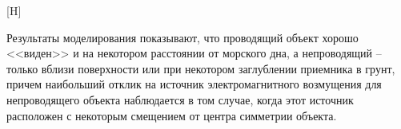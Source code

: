 \documentclass[a4paper,14pt]{article}
\makeatletter
\renewenvironment{figure}[1][\fps@figure]{
  \edef\@tempa{\noexpand\@float{figure}[#1]}
  \@tempa
  \addtocounter{foofigure}{1}
}{
  \end@float
}
\renewcommand{\Re}{\mathop{\mathrm{Re}}\nolimits}
\makeatother
\begin{document}
\begin{figure}[H]
	\centering
	\text{~~}
	\caption{$\Re(\mathbf{E}_z)$ при $l_2=-300$}
	\label{fig:res3:300_EzR}
\end{figure}


Результаты моделирования показывают, что проводящий объект хорошо <<виден>> и на некотором расстоянии от морского дна, а непроводящий -- только вблизи поверхности или при некотором заглублении приемника в грунт, причем наибольший отклик на источник электромагнитного возмущения для непроводящего объекта наблюдается в том случае, когда этот источник расположен с некоторым смещением от центра симметрии объекта.
\end{document}

